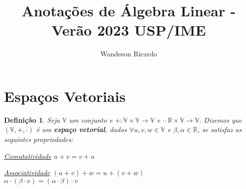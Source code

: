 \documentclass[12pt,a4paper]{article}
\title{Anotações de Álgebra Linear - Verão 2023 USP/IME}
\author{Wandeson Ricardo}
\newtheorem{definicao}{Definição}
\begin{document}
\maketitle

\section{Espaços Vetoriais}

\begin{definicao}
	Seja $\mathbb{V}$ um conjunto e $+: \mathbb{V}\times\mathbb{V} \rightarrow \mathbb{V}$ e $\cdot : \mathbb{R} \times \mathbb{V} \rightarrow \mathbb{V}$. Dizemos que $(\mathbb{V}, +, \cdot )$ é um \textbf{\textit{espaço vetorial}}, dados $\forall u,v,w \in \mathbb{V}$ e $\beta, \alpha \in \mathbb{R}$, se satisfaz as seguintes propriedades:\\
	
	\item \underline{Comutatividade} $u + v = v + u$\\
	\item  \underline{Associatividade} $( u + v ) + w = u + (v + w)$\\
										$\alpha \cdot (\beta \cdot v)  = (\alpha \cdot \beta)\cdot  v$
	\item \underline{}
\end{definicao}
	
\end{document}
